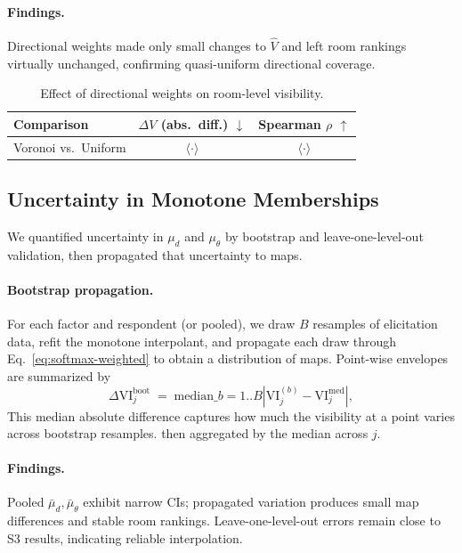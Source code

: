 \documentclass[final,3p,times,review]{elsarticle}
\begin{document}
\paragraph{Findings.}
Directional weights made only small changes to $\widehat{V}$ and left room rankings virtually unchanged, confirming quasi-uniform directional coverage.

\begin{table}[H]
\centering
\caption{Effect of directional weights on room-level visibility.}
\label{tab:omega}
\begin{tabular}{@{}lcc@{}}
\toprule
Comparison & \(\Delta V\) (abs.\ diff.) \(\downarrow\) & Spearman \(\rho\) \(\uparrow\) \\
\midrule
Voronoi vs.\ Uniform & \(\langle\cdot\rangle\) & \(\langle\cdot\rangle\) \\
\bottomrule
\end{tabular}
\end{table}


\subsection{Uncertainty in Monotone Memberships}
We quantified uncertainty in $\mu_d$ and $\mu_\theta$ by bootstrap and leave-one-level-out validation, then propagated that uncertainty to maps.

\paragraph{Bootstrap propagation.}
For each factor and respondent (or pooled), we draw $B$ resamples of elicitation data, refit the monotone interpolant, and propagate each draw through Eq.~\eqref{eq:softmax-weighted} to obtain a distribution of maps. Point-wise envelopes are summarized by
\begin{equation}
\Delta \mathrm{VI}_j^{\mathrm{boot}} \;=\; \mathrm{median}\_{b=1..B}\left| \mathrm{VI}_j^{(b)} - \mathrm{VI}_j^{\mathrm{med}} \right|,
\label{eq:boot-map-diff}
\end{equation}
This median absolute difference captures how much the visibility at a point varies across bootstrap resamples.
then aggregated by the median across $j$.

\paragraph{Findings.}
Pooled $\bar{\mu}_d,\bar{\mu}_\theta$ exhibit narrow CIs; propagated variation produces small map differences and stable room rankings. Leave-one-level-out errors remain close to S3 results, indicating reliable interpolation.
\end{document}
